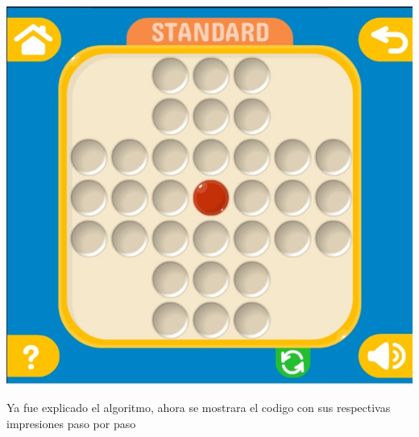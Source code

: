 \documentclass[10pt,a4paper]{report}
\begin{document}
\begin{center}
	\includegraphics[scale=.3]{finalState.jpg} \hspace{6cm}
\end{center}

Ya fue explicado el algoritmo, ahora se mostrara el codigo con sus respectivas impresiones paso por paso
\end{document}
